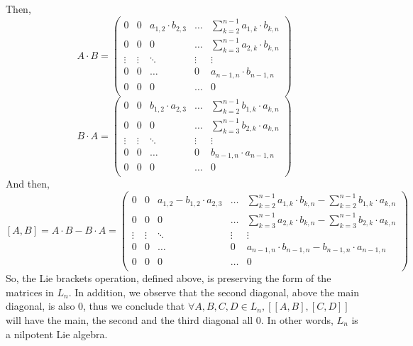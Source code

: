 \documentclass[12pt]{article}
\begin{document}
Then,
$$ A \cdot B=\begin{pmatrix} 
	0 & 0 & a_{1,2} \cdot b_{2,3} & \dots & \sum_{k=2}^{n-1} a_{1,k} \cdot b_{k,n} \\
	0 & 0 & 0 & \dots & \sum_{k=3}^{n-1} a_{2,k} \cdot b_{k,n} \\
	\vdots & \vdots & \ddots & \vdots & \vdots \\
	0 & 0 & \dots & 0 & a_{n-1,n} \cdot b_{n-1,n} \\
	0 & 0 & 0 & \dots & 0 \\
\end{pmatrix} $$
$$ B \cdot A=\begin{pmatrix} 
	0 & 0 & b_{1,2} \cdot a_{2,3} & \dots & \sum_{k=2}^{n-1} b_{1,k} \cdot a_{k,n} \\
	0 & 0 & 0 & \dots & \sum_{k=3}^{n-1} b_{2,k} \cdot a_{k,n} \\
	\vdots & \vdots & \ddots & \vdots & \vdots \\
	0 & 0 & \dots & 0 & b_{n-1,n} \cdot a_{n-1,n} \\
	0 & 0 & 0 & \dots & 0 \\
\end{pmatrix}
$$
And then,
$$ [A,B]=A \cdot B-B \cdot A=\begin{pmatrix} 
	0 & 0 & a_{1,2}-b_{1,2} \cdot a_{2,3} & \dots & \sum_{k=2}^{n-1} a_{1,k} \cdot b_{k,n}-\sum_{k=2}^{n-1} b_{1,k} \cdot a_{k,n} \\
	0 & 0 & 0 & \dots & \sum_{k=3}^{n-1} a_{2,k} \cdot b_{k,n}-\sum_{k=3}^{n-1} b_{2,k} \cdot a_{k,n} \\
	\vdots & \vdots & \ddots & \vdots & \vdots \\
	0 & 0 & \dots & 0 & a_{n-1,n} \cdot b_{n-1,n}-b_{n-1,n} \cdot a_{n-1,n} \\
	0 & 0 & 0 & \dots & 0 \\
\end{pmatrix}
$$
So, the Lie brackets operation, defined above, is preserving the form of the matrices in \( L_{n} \). \newline
In addition, we observe that the second diagonal, above the main diagonal, is also \( 0\), thus we conclude \newline
that \( \forall A,B,C,D \in L_{n},[[A,B],[C,D]] \) will have the main, the second and the third diagonal all \( 0 \). \newline
In other words, \( L_{n} \) is a nilpotent Lie algebra. \newline
\end{document}

